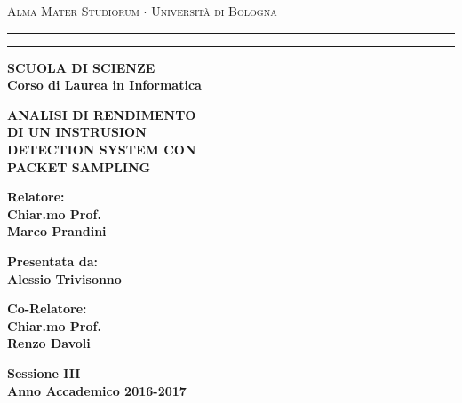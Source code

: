 \documentclass[12pt,a4paper]{report}
\begin{document}
\begin{titlepage}
\begin{center}
{{\Large{\textsc{Alma Mater Studiorum $\cdot$ Universit\`a di
Bologna}}}} \rule[0.1cm]{15.8cm}{0.1mm}
\rule[0.5cm]{15.8cm}{0.6mm}
{\small{\bf SCUOLA DI SCIENZE\\
Corso di Laurea in Informatica }}
\end{center}
\vspace{15mm}
\begin{center}
{\LARGE{\bf ANALISI DI RENDIMENTO}}\\
\vspace{3mm}
{\LARGE{\bf DI UN INSTRUSION }}\\
\vspace{3mm}
{\LARGE{\bf  DETECTION SYSTEM CON }}\\
\vspace{3mm}
{\LARGE{\bf PACKET SAMPLING}}\\
\end{center}
\vspace{40mm}
\par
\noindent
\begin{minipage}[t]{0.47\textwidth}
{\large{\bf Relatore:\\
Chiar.mo Prof.\\
Marco Prandini}}
\end{minipage}
\vspace{15mm}
\hfill
\begin{minipage}[t]{0.47\textwidth}\raggedleft
{\large{\bf Presentata da:\\
Alessio Trivisonno}}
\end{minipage}
\begin{minipage}[t]{0.47\textwidth}
{\large{\bf Co-Relatore:\\
Chiar.mo Prof.\\
Renzo Davoli}}
\end{minipage}
\vspace{20mm}
\begin{center}
{\large{\bf Sessione III\\%
Anno Accademico 2016-2017 }}%
\end{center}
\end{titlepage}
\end{document}
